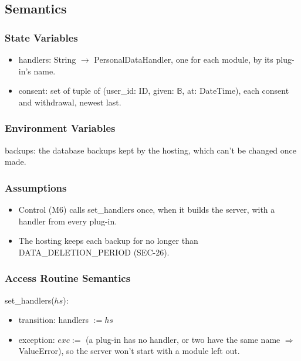 \documentclass[12pt, titlepage]{article}
\begin{document}
\subsection{Semantics}

\subsubsection{State Variables}

\begin{itemize}
\item handlers: String $\rightarrow$ PersonalDataHandler, one for each
  module, by its plug-in's name.
\item consent: set of tuple of (user\_id: ID, given: $\mathbb{B}$, at:
  DateTime), each consent and withdrawal, newest last.
\end{itemize}

\subsubsection{Environment Variables}

\noindent backups: the database backups kept by the hosting, which can't be
changed once made.

\subsubsection{Assumptions}

\begin{itemize}
\item Control (M6) calls set\_handlers once, when it builds the server, with
  a handler from every plug-in.
\item The hosting keeps each backup for no longer than
  DATA\_DELETION\_PERIOD (SEC-26).
\end{itemize}

\subsubsection{Access Routine Semantics}

\noindent set\_handlers($hs$):
\begin{itemize}
\item transition: handlers $:= hs$
\item exception: $exc :=$ (a plug-in has no handler, or two have the same
  name $\Rightarrow$ ValueError), so the server won't start with a module
  left out.
\end{itemize}
\end{document}
